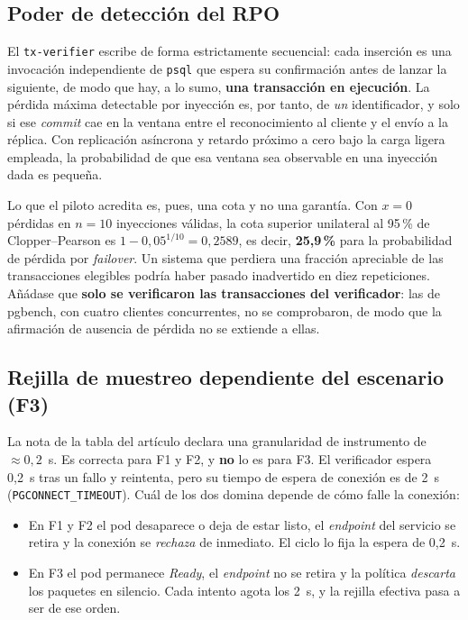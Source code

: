 \documentclass[11pt,letterpaper]{article}
\begin{document}
\subsection*{Poder de detección del RPO}
El \texttt{tx-verifier} escribe de forma estrictamente secuencial: cada inserción es una invocación
independiente de \texttt{psql} que espera su confirmación antes de lanzar la siguiente, de modo que
hay, a lo sumo, \textbf{una transacción en ejecución}. La pérdida máxima detectable por inyección es, por
tanto, de \emph{un} identificador, y solo si ese \textit{commit} cae en la ventana entre el
reconocimiento al cliente y el envío a la réplica. Con replicación asíncrona y retardo próximo a
cero bajo la carga ligera empleada, la probabilidad de que esa ventana sea observable en una
inyección dada es pequeña.

Lo que el piloto acredita es, pues, una cota y no una garantía. Con $x=0$ pérdidas en $n=10$
inyecciones válidas, la cota superior unilateral al 95\,\% de Clopper--Pearson es
$1-0{,}05^{1/10}=0{,}2589$, es decir, \textbf{25,9\,\%} para la probabilidad de pérdida por
\textit{failover}. Un sistema que perdiera una fracción apreciable de las transacciones elegibles
podría haber pasado inadvertido en diez repeticiones. Añádase que \textbf{solo se verificaron las
transacciones del verificador}: las de pgbench, con cuatro clientes concurrentes, no se
comprobaron, de modo que la afirmación de ausencia de pérdida no se extiende a ellas.

\subsection*{Rejilla de muestreo dependiente del escenario (F3)}
La nota de la tabla del artículo declara una granularidad de instrumento de $\approx 0{,}2$~s. Es
correcta para F1 y F2, y \textbf{no} lo es para F3. El verificador espera 0,2~s tras un fallo y
reintenta, pero su tiempo de espera de conexión es de 2~s (\texttt{PGCONNECT\_TIMEOUT}). Cuál de
los dos domina depende de cómo falle la conexión:

\begin{itemize}[leftmargin=1.2em,itemsep=2pt,topsep=2pt]
\item En F1 y F2 el pod desaparece o deja de estar listo, el \textit{endpoint} del servicio se
retira y la conexión se \emph{rechaza} de inmediato. El ciclo lo fija la espera de 0,2~s.
\item En F3 el pod permanece \textit{Ready}, el \textit{endpoint} no se retira y la política
\emph{descarta} los paquetes en silencio. Cada intento agota los 2~s, y la rejilla efectiva pasa a
ser de ese orden.
\end{itemize}
\end{document}
